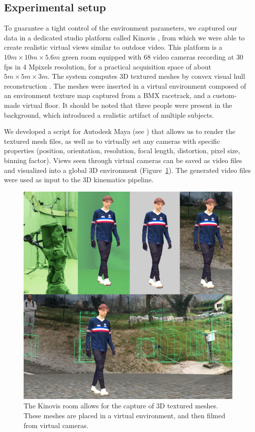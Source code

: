 \subsection{Experimental setup}

To guarantee a tight control of the environment parameters, we captured our data in a dedicated studio platform called Kinovis \cite{Tsiminaki2014}, from which we were able to create realistic virtual views similar to outdoor video. This platform is a \(10 m \times 10 m \times 5.6 m\) green room equipped with 68 video cameras recording at 30 fps in 4 Mpixels resolution, for a practical acquisition space of about \(5 m  \times 5 m  \times 3 m\). The system computes 3D textured meshes by convex visual hull reconstruction \cite{Laurentini1994}. The meshes were inserted in a virtual environment composed of an environment texture map captured from a BMX racetrack, and a custom-made virtual floor. It should be noted that three people were present in the background, which introduced a realistic artifact of multiple subjects.

We developed a script for Autodesk Maya \cite{Maya1998} (see ) that allows us to render the textured mesh files, as well as to virtually set any cameras with specific properties (position, orientation, resolution, focal length, distortion, pixel size, binning factor). Views seen through virtual cameras can be saved as video files and visualized into a global 3D environment (Figure~\ref{fig_kinovis}). The generated video files were used as input to the 3D kinematics pipeline.

\begin{figure}[!ht]
	\centering
	\def\svgwidth{1\columnwidth}
	\fontsize{10pt}{10pt}\selectfont
	\includegraphics[width=\linewidth]{"../Chap4/Figures/Fig_Kinovis.png"}
	\caption{The Kinovis room allows for the capture of 3D textured meshes. These meshes are placed in a virtual environment, and then filmed from virtual cameras.}
	\label{fig_kinovis}
\end{figure}

